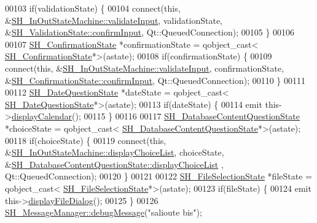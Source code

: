 \begin{DoxyCode}
00103         \textcolor{keywordflow}{if}(validationState) \{
00104             connect(\textcolor{keyword}{this}, &\hyperlink{classSH__InOutStateMachine_aec1b3fef3c1f82499aa1f73beaecd08a}{SH\_InOutStateMachine::validateInput}, 
      validationState, &\hyperlink{classSH__ConfirmationState_a039267260de5d102ac7511e6a5fae87f}{SH\_ValidationState::confirmInput}, Qt::QueuedConnection);
00105         \}
00106 
00107         \hyperlink{classSH__ConfirmationState}{SH\_ConfirmationState} *confirmationState = qobject\_cast<
      \hyperlink{classSH__ConfirmationState}{SH\_ConfirmationState}*>(astate);
00108         \textcolor{keywordflow}{if}(confirmationState) \{
00109             connect(\textcolor{keyword}{this}, &\hyperlink{classSH__InOutStateMachine_aec1b3fef3c1f82499aa1f73beaecd08a}{SH\_InOutStateMachine::validateInput}, 
      confirmationState, &\hyperlink{classSH__ConfirmationState_a039267260de5d102ac7511e6a5fae87f}{SH\_ConfirmationState::confirmInput}, Qt::QueuedConnection);
00110         \}
00111 
00112         \hyperlink{classSH__DateQuestionState}{SH\_DateQuestionState} *dateState = qobject\_cast<
      \hyperlink{classSH__DateQuestionState}{SH\_DateQuestionState}*>(astate);
00113         \textcolor{keywordflow}{if}(dateState) \{
00114             emit this->\hyperlink{classSH__InOutStateMachine_ab3a12d1f9b658d8ffdc17669a6c065f2}{displayCalendar}();
00115         \}
00116 
00117         \hyperlink{classSH__DatabaseContentQuestionState}{SH\_DatabaseContentQuestionState} *choiceState = qobject\_cast<
      \hyperlink{classSH__DatabaseContentQuestionState}{SH\_DatabaseContentQuestionState}*>(astate);
00118         \textcolor{keywordflow}{if}(choiceState) \{
00119             connect(\textcolor{keyword}{this}, &\hyperlink{classSH__InOutStateMachine_ab74b981b0aab09067d7479f2b7e79b0b}{SH\_InOutStateMachine::displayChoiceList}, 
      choiceState, &\hyperlink{classSH__DatabaseContentQuestionState_ae1e149ad7ab3d957f3c5df9ef078448b}{SH\_DatabaseContentQuestionState::displayChoiceList}
      , Qt::QueuedConnection);
00120         \}
00121 
00122         \hyperlink{classSH__FileSelectionState}{SH\_FileSelectionState} *fileState = qobject\_cast<
      \hyperlink{classSH__FileSelectionState}{SH\_FileSelectionState}*>(astate);
00123         \textcolor{keywordflow}{if}(fileState) \{
00124             emit this->\hyperlink{classSH__InOutStateMachine_abd206c3bc32bb7690df9c3e1cd546ebc}{displayFileDialog}();
00125         \}
00126         \hyperlink{classSH__MessageManager_a379f2aa0a590a5add34dbe91f98b2ff7}{SH\_MessageManager::debugMessage}(\textcolor{stringliteral}{"salioute bis"});

\end{DoxyCode}
